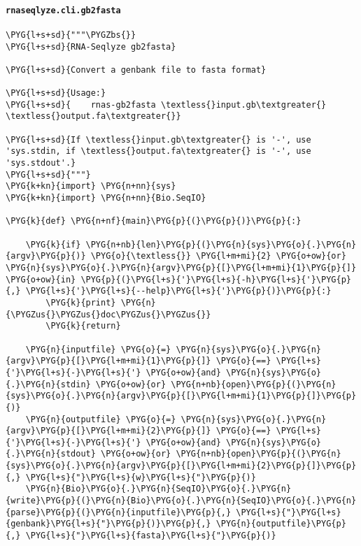 \paragraph{\texttt{rnaseqlyze.cli.gb2fasta}}
\label{index-pdf4:rnaseqlyze-cli-gb2fasta}
\begin{Verbatim}[commandchars=\\\{\}]
\PYG{l+s+sd}{"""\PYGZbs{}}
\PYG{l+s+sd}{RNA-Seqlyze gb2fasta}

\PYG{l+s+sd}{Convert a genbank file to fasta format}

\PYG{l+s+sd}{Usage:}
\PYG{l+s+sd}{    rnas-gb2fasta \textless{}input.gb\textgreater{} \textless{}output.fa\textgreater{}}

\PYG{l+s+sd}{If \textless{}input.gb\textgreater{} is '-', use 'sys.stdin, if \textless{}output.fa\textgreater{} is '-', use 'sys.stdout'.}
\PYG{l+s+sd}{"""}
\PYG{k+kn}{import} \PYG{n+nn}{sys}
\PYG{k+kn}{import} \PYG{n+nn}{Bio.SeqIO}

\PYG{k}{def} \PYG{n+nf}{main}\PYG{p}{(}\PYG{p}{)}\PYG{p}{:}

    \PYG{k}{if} \PYG{n+nb}{len}\PYG{p}{(}\PYG{n}{sys}\PYG{o}{.}\PYG{n}{argv}\PYG{p}{)} \PYG{o}{\textless{}} \PYG{l+m+mi}{2} \PYG{o+ow}{or} \PYG{n}{sys}\PYG{o}{.}\PYG{n}{argv}\PYG{p}{[}\PYG{l+m+mi}{1}\PYG{p}{]} \PYG{o+ow}{in} \PYG{p}{(}\PYG{l+s}{'}\PYG{l+s}{-h}\PYG{l+s}{'}\PYG{p}{,} \PYG{l+s}{'}\PYG{l+s}{--help}\PYG{l+s}{'}\PYG{p}{)}\PYG{p}{:}
        \PYG{k}{print} \PYG{n}{\PYGZus{}\PYGZus{}doc\PYGZus{}\PYGZus{}}
        \PYG{k}{return}

    \PYG{n}{inputfile} \PYG{o}{=} \PYG{n}{sys}\PYG{o}{.}\PYG{n}{argv}\PYG{p}{[}\PYG{l+m+mi}{1}\PYG{p}{]} \PYG{o}{==} \PYG{l+s}{'}\PYG{l+s}{-}\PYG{l+s}{'} \PYG{o+ow}{and} \PYG{n}{sys}\PYG{o}{.}\PYG{n}{stdin} \PYG{o+ow}{or} \PYG{n+nb}{open}\PYG{p}{(}\PYG{n}{sys}\PYG{o}{.}\PYG{n}{argv}\PYG{p}{[}\PYG{l+m+mi}{1}\PYG{p}{]}\PYG{p}{)}
    \PYG{n}{outputfile} \PYG{o}{=} \PYG{n}{sys}\PYG{o}{.}\PYG{n}{argv}\PYG{p}{[}\PYG{l+m+mi}{2}\PYG{p}{]} \PYG{o}{==} \PYG{l+s}{'}\PYG{l+s}{-}\PYG{l+s}{'} \PYG{o+ow}{and} \PYG{n}{sys}\PYG{o}{.}\PYG{n}{stdout} \PYG{o+ow}{or} \PYG{n+nb}{open}\PYG{p}{(}\PYG{n}{sys}\PYG{o}{.}\PYG{n}{argv}\PYG{p}{[}\PYG{l+m+mi}{2}\PYG{p}{]}\PYG{p}{,} \PYG{l+s}{"}\PYG{l+s}{w}\PYG{l+s}{"}\PYG{p}{)}
    \PYG{n}{Bio}\PYG{o}{.}\PYG{n}{SeqIO}\PYG{o}{.}\PYG{n}{write}\PYG{p}{(}\PYG{n}{Bio}\PYG{o}{.}\PYG{n}{SeqIO}\PYG{o}{.}\PYG{n}{parse}\PYG{p}{(}\PYG{n}{inputfile}\PYG{p}{,} \PYG{l+s}{"}\PYG{l+s}{genbank}\PYG{l+s}{"}\PYG{p}{)}\PYG{p}{,} \PYG{n}{outputfile}\PYG{p}{,} \PYG{l+s}{"}\PYG{l+s}{fasta}\PYG{l+s}{"}\PYG{p}{)}
\end{Verbatim}



